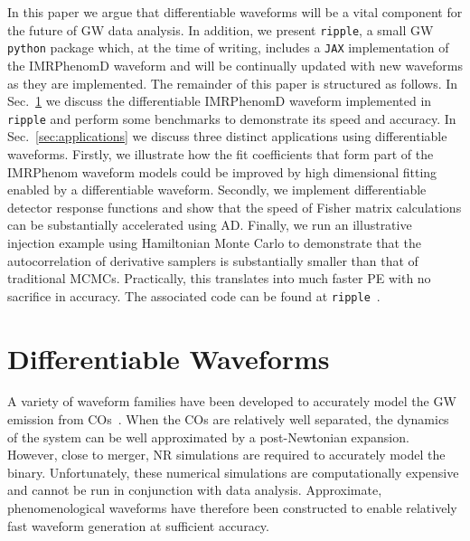 \documentclass[twocolumn]{aastex631}
\newcommand{\jax}{\texttt{JAX}\xspace}
\newcommand{\ripple}{\texttt{ripple}\xspace}
\newcommand{\AZ}[1]{{\color{Burnt}[AZ: #1]}}
\begin{document}
In this paper we argue that differentiable waveforms will be a vital component for the future of GW data analysis.
In addition, we present \ripple, a small GW \texttt{python} package which, at the time of writing, includes a \jax implementation of the IMRPhenomD waveform and will be continually updated with new waveforms as they are implemented.
The remainder of this paper is structured as follows. 
In Sec.~\ref{sec:waveforms} we discuss the differentiable IMRPhenomD waveform implemented in \ripple and perform some benchmarks to demonstrate its speed and accuracy. 
In Sec.~\ref{sec:applications} we discuss three distinct applications using differentiable waveforms. 
Firstly, we illustrate how the fit coefficients that form part of the IMRPhenom waveform models could be improved by high dimensional fitting enabled by a differentiable waveform. 
Secondly, we implement differentiable detector response functions and show that the speed of Fisher matrix calculations can be substantially accelerated using AD.
Finally, we run an illustrative injection example using Hamiltonian Monte Carlo to demonstrate that the autocorrelation of derivative samplers is substantially smaller than that of traditional MCMCs.
Practically, this translates into much faster PE with no sacrifice in accuracy.
The associated code can be found at \ripple~\citep{ripple}.

\section{Differentiable Waveforms}
\label{sec:waveforms}

A variety of waveform families have been developed to accurately model the GW emission from COs~\citep{Schmidtreview}. 
When the COs are relatively well separated, the dynamics of the system can be well approximated by a post-Newtonian expansion.
However, close to merger, NR simulations are required to accurately model the binary.
Unfortunately, these numerical simulations are computationally expensive and cannot be run in conjunction with data analysis.
Approximate, phenomenological waveforms have therefore been constructed to enable relatively fast waveform generation at sufficient accuracy.
\end{document}
